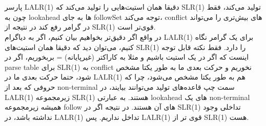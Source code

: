 \\
\\
پارسر LALR(1) دقیقا همان استیت‌هایی را تولید می‌کند که SLR(1) تولید می‌کند، فقط چون به lookahead ها به جای followSet توجه می‌کند، conflict های بیش‌تری را می‌تواند در گرامر رفع کند در نتیجه از SLR(1) قوی‌تر است. 
\\
در واقع اگر دقیق‌تر بخواهیم بیان کنیم، اگر به دیاگرام LALR(1) برای یک گرامر نگاه کنیم، می‌توان دید که دقیقا همان استیت‌های SLR(1) را دارد. فقط نکته قابل توجه اینست که اگر در یک استیت باشیم و مثلا به کاراکتر (غیرپایانه) = بربخوریم، اگر در parse table برای SLR(1) به conflict نخوریم و حرکت بعدی ما به طور یکتا مشخص شود، حتما حرکت بعدی ما در LALR(1) هم به طور یکتا مشخص می‌شود، چرا که حروفی که بعد از non-terminal سمت چپ قاعده‌های تولید می‌توانند بیایند، در LALR(1) زیرمجموعه SLR(1) هستند. به عبارتی lookahead های یک non-terminal همیشه زیرمجموعه follow های آن هستند. در نتیجه اگر در SLR(1) تداخلی وجود نداشته باشد، در LALR(1) تداخل نداریم. پس LALR(1) قوی تر از SLR(1) هست.
\\

